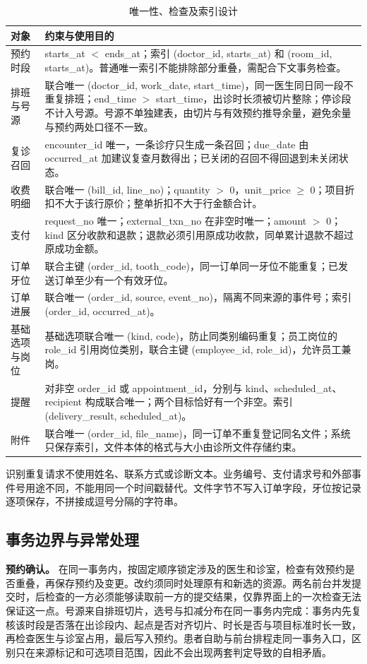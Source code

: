 \clearpage
\begin{table}[H]\centering\caption{唯一性、检查及索引设计}
\small\begin{tabularx}{\textwidth}{L{3.0cm}Y}
\toprule 对象 & 约束与使用目的\\\midrule
预约时段 & starts\_at $<$ ends\_at；索引 (doctor\_id, starts\_at) 和 (room\_id, starts\_at)。普通唯一索引不能排除部分重叠，需配合下文事务检查。\\
排班与号源 & 联合唯一 (doctor\_id, work\_date, start\_time)，同一医生同日同一段不重复排班；end\_time $>$ start\_time，出诊时长须被切片整除；停诊段不计入号源。号源不单独建表，由切片与有效预约推导余量，避免余量与预约两处口径不一致。\\
复诊召回 & encounter\_id 唯一，一条诊疗只生成一条召回；due\_date 由 occurred\_at 加建议复查月数得出；已关闭的召回不得回退到未关闭状态。\\
收费明细 & 联合唯一 (bill\_id, line\_no)；quantity $>$ 0，unit\_price $\geq$ 0；项目折扣不大于该行原价；整单折扣不大于行金额合计。\\
支付 & request\_no 唯一；external\_txn\_no 在非空时唯一；amount $>$ 0；kind 区分收款和退款；退款必须引用原成功收款，同单累计退款不超过原成功金额。\\
订单牙位 & 联合主键 (order\_id, tooth\_code)，同一订单同一牙位不能重复；已发送订单至少有一个有效牙位。\\
订单进展 & 联合唯一 (order\_id, source, event\_no)，隔离不同来源的事件号；索引 (order\_id, occurred\_at)。\\
基础选项与岗位 & 基础选项联合唯一 (kind, code)，防止同类别编码重复；员工岗位的 role\_id 引用岗位类别，联合主键 (employee\_id, role\_id)，允许员工兼岗。\\
提醒 & 对非空 order\_id 或 appointment\_id，分别与 kind、scheduled\_at、recipient 构成联合唯一；两个目标恰好有一个非空。索引 (delivery\_result, scheduled\_at)。\\
附件 & 联合唯一 (order\_id, file\_name)，同一订单不重复登记同名文件；系统只保存索引，文件本体的格式与大小由诊所文件存储约束。\\
\bottomrule\end{tabularx}\end{table}

识别重复请求不使用姓名、联系方式或诊断文本。业务编号、支付请求号和外部事件号用途不同，不能用同一个时间戳替代。文件字节不写入订单字段，牙位按记录逐项保存，不拼接成逗号分隔的字符串。

\subsection{事务边界与异常处理}
\textbf{预约确认。} 在同一事务内，按固定顺序锁定涉及的医生和诊室，检查有效预约是否重叠，再保存预约及变更。改约须同时处理原有和新选的资源。两名前台并发提交时，后检查的一方必须能够读取前一方的提交结果，仅靠界面上的一次检查无法保证这一点。号源来自排班切片，选号与扣减分布在同一事务内完成：事务内先复核该时段是否落在出诊段内、起点是否对齐切片、时长是否与项目标准时长一致，再检查医生与诊室占用，最后写入预约。患者自助与前台排程走同一事务入口，区别只在来源标记和可选项目范围，因此不会出现两套判定导致的自相矛盾。

